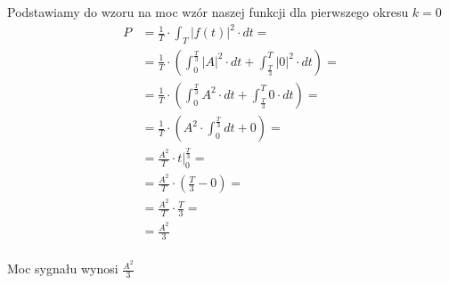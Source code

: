 \begin{task}
Podstawiamy do wzoru na moc wzór naszej funkcji dla pierwszego okresu $k=0$
\begin{align*}
P&=\frac{1}{T} \cdot \int_{T}\left|f(t)\right|^2 \cdot dt =\\
&=\frac{1}{T} \cdot \left( \int_{0}^{\frac{T}{3}}\left| A \right|^2 \cdot dt + \int_{\frac{T}{3}}^{T}\left| 0 \right|^2 \cdot dt\right)=\\
&=\frac{1}{T} \cdot \left( \int_{0}^{\frac{T}{3}} A ^2 \cdot dt + \int_{\frac{T}{3}}^{T}0 \cdot dt\right)=\\
&=\frac{1}{T} \cdot \left( A ^2 \cdot \int_{0}^{\frac{T}{3}} dt + 0\right)=\\
&=\frac{A^2}{T} \cdot \left. t \right|_{0}^{\frac{T}{3}}=\\
&=\frac{A^2}{T} \cdot \left( \frac{T}{3} - 0 \right)=\\
&=\frac{A^2}{T} \cdot \frac{T}{3}=\\
&=\frac{A^2}{3}\\
\end{align*}

Moc sygnału wynosi $\frac{A^2}{3}$
\end{task}